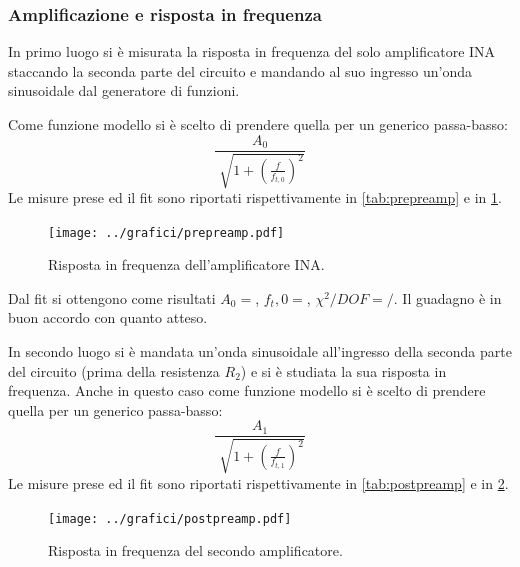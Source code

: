 \documentclass[a4paper,10pt]{article}
\begin{document}
\subsubsection*{Amplificazione e risposta in frequenza}

In primo luogo si è misurata la risposta in frequenza del solo amplificatore INA staccando la seconda parte del circuito e mandando al suo ingresso un'onda sinusoidale dal generatore di funzioni.
 
Come funzione modello si è scelto di prendere quella per un generico passa-basso:
\begin{equation}
\frac{A_0}{\sqrt[]{1+(\frac{f}{f_{t,0}})^2}}
\end{equation}
Le misure prese ed il fit sono riportati rispettivamente in \cref{tab:prepreamp} e in \cref{fig:prepreamp}.

\vspace*{-10pt}
\begin{figure}[H]
	\centering
	\texttt{[image: ../grafici/prepreamp.pdf]}
	\vspace*{-10pt}
	\caption{Risposta in frequenza dell'amplificatore INA.}
	\label{fig:prepreamp}
\end{figure}
\vspace*{-10pt}

Dal fit si ottengono come risultati $A_0 = $, $f_t,0 = $, $\chi^2/DOF = /$. Il guadagno è in buon accordo con quanto atteso. 

In secondo luogo si è mandata un'onda sinusoidale all'ingresso della seconda parte del circuito (prima della resistenza $R_2$) e si è studiata la sua risposta in frequenza.
Anche in questo caso come funzione modello si è scelto di prendere quella per un generico passa-basso:
\vspace*{-5pt}
\begin{equation}
\frac{A_1}{\sqrt[]{1+(\frac{f}{f_{t,1}})^2}}
\end{equation}
\vspace*{-5pt}
 Le misure prese ed il fit sono riportati rispettivamente in \cref{tab:postpreamp} e in \cref{fig:postpreamp}.

\vspace*{-5pt}
\begin{figure}[H]
	\centering
	\texttt{[image: ../grafici/postpreamp.pdf]}
	\vspace*{-10pt}
	\caption{Risposta in frequenza del secondo amplificatore.}
	\label{fig:postpreamp}
\end{figure}
\vspace*{-10pt}
\end{document}
